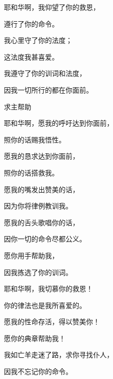 {\par }{\Q {}耶和华啊，我仰望了你的救恩，
\par }{\Q 遵行了你的命令。
\par }{\Q {}我心里守了你的法度；
\par }{\Q 这法度我甚喜爱。
\par }{\Q {}我遵守了你的训词和法度，
\par }{\Q 因我一切所行的都在你面前。
\par }{\SH 求主帮助
\par }{\Q {}耶和华啊，愿我的呼吁达到你面前，
\par }{\Q 照你的话赐我悟性。
\par }{\Q {}愿我的恳求达到你面前，
\par }{\Q 照你的话搭救我。
\par }{\Q {}愿我的嘴发出赞美的话，
\par }{\Q 因为你将律例教训我。
\par }{\Q {}愿我的舌头歌唱你的话，
\par }{\Q 因你一切的命令尽都公义。
\par }{\Q {}愿你用手帮助我，
\par }{\Q 因我拣选了你的训词。
\par }{\Q {}耶和华啊，我切慕你的救恩！
\par }{\Q 你的律法也是我所喜爱的。
\par }{\Q {}愿我的性命存活，得以赞美你！
\par }{\Q 愿你的典章帮助我！
\par }{\Q {}我如亡羊走迷了路，求你寻找仆人，
\par }{\Q 因我不忘记你的命令。

\par }
